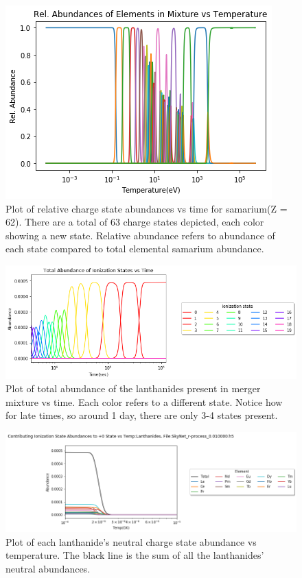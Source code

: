 \documentclass[11pt,a4paper]{article}
\begin{document}
\begin{figure}[h!]
  \includegraphics[scale = .75]{samarium.png}
  \centering
  \caption{Plot of relative charge state abundances vs time for samarium(Z = 62). There are a total of 63 charge states depicted, each color showing a new state. Relative abundance refers to abundance of each state compared to total elemental samarium abundance.}
\end{figure} 


\begin{figure}[h!]
  \includegraphics[scale = .65]{total.png}
  \centering
  \caption{Plot of total abundance of the lanthanides present in merger mixture vs time. Each color refers to a different state. Notice how for late times, so around 1 day, there are only 3-4 states present.}
\end{figure} 


\begin{figure}[h!]
  \includegraphics[scale = .6]{neutral.png}
  \caption{Plot of each lanthanide's neutral charge state abundance vs temperature. The black line is the sum of all the lanthanides' neutral abundances. }
\end{figure} 
\end{document}
